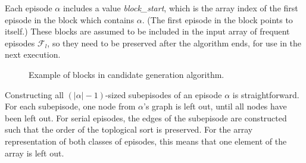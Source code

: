 
Each episode $ \alpha $ includes a value \emph{block\_start}, which is the array index of the first episode in the block which contains $ \alpha $. (The first episode in the block points to itself.) These blocks are assumed to be included in the input array of frequent episodes $ \mathcal{F}_l $, so they need to be preserved after the algorithm ends, for use in the next execution.


\begin{figure}[h]
\centering


\caption{Example of blocks in candidate generation algorithm.}

\end{figure}

Constructing all $ (| \alpha | - 1) $-sized subepisodes of an episode $ \alpha $ is straightforward. For each subepisode, one node from $ \alpha $'s graph is left out, until all nodes have been left out. For serial episodes, the edges of the subepisode are constructed such that the order of the toplogical sort is preserved. For the array representation of both classes of episodes, this means that one element of the array is left out.

